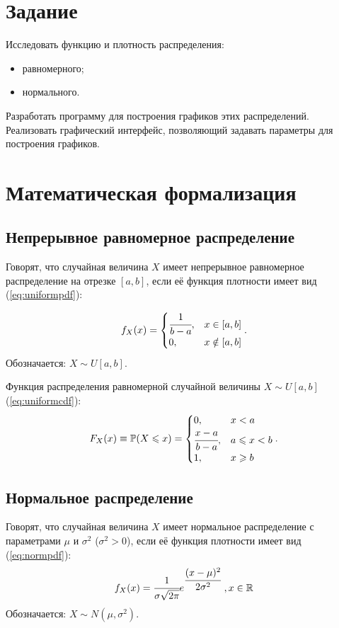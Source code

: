 \chapter{Задание}

\noindent Исследовать функцию и плотность распределения:
\begin{itemize}
	\item равномерного;
	\item нормального.
\end{itemize}
Разработать программу для построения графиков этих распределений. Реализовать графический интерфейс, позволяющий задавать параметры для построения графиков.

\chapter{Математическая формализация}
\section{Непрерывное равномерное распределение}
Говорят, что случайная величина $X$ имеет непрерывное равномерное распределение на отрезке $\displaystyle [a,b]$, если её  функция плотности имеет вид (\ref{eq:uniformpdf}):

\begin{equation}\label{eq:uniformpdf}
	 f_{X}(x) = \begin{cases}
	 				\cfrac{1}{b - a}, & x \in [a,b] \\
	 				0, & x \notin [a,b] \\
	 			\end{cases}.
\end{equation}
Обозначается: $X\sim U[a,b]$.

\noindent Функция распределения равномерной случайной величины  $X\sim U[a,b]$ (\ref{eq:uniformcdf}):
\begin{equation}\label{eq:uniformcdf}
	F_{X}(x)\equiv \mathbb {P} (X\leqslant x) = 
	\begin{cases}
		0, & x < a \\
		\cfrac{x - a}{b - a}, & a\leqslant x < b \\
		1, & x\geqslant b
	\end{cases}.
\end{equation}

\section{Нормальное распределение}
Говорят, что случайная величина $X$ имеет нормальное распределение с параметрами $\mu$ и $\sigma^2$ ($\sigma^2 > 0$), если её функция плотности имеет вид (\ref{eq:normpdf}):
\begin{equation}\label{eq:normpdf}
	f_{X}(x) = \cfrac{1}{\sigma\sqrt{2\pi}}e^{\cfrac{(x - \mu)^2}{2\sigma^2}}\;, x \in \mathbb{R}
\end{equation}
Обозначается: $X\sim N(\mu, \sigma^2)$.

